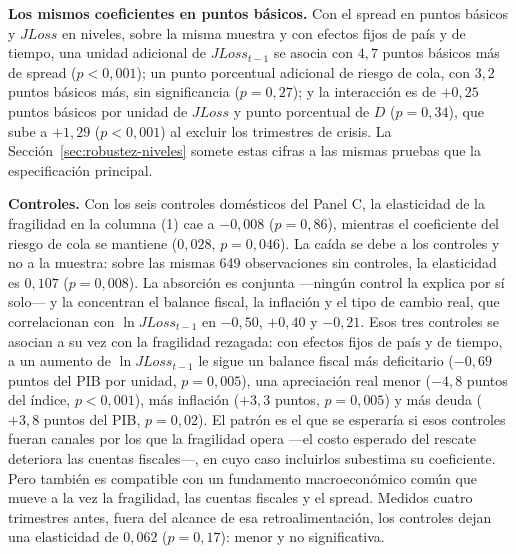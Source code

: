\textbf{Los mismos coeficientes en puntos básicos.} Con el spread en puntos básicos y $JLoss$ en niveles, sobre la misma muestra y con efectos fijos de país y de tiempo, una unidad adicional de $JLoss_{t-1}$ se asocia con $4{,}7$ puntos básicos más de spread ($p<0{,}001$); un punto porcentual adicional de riesgo de cola, con $3{,}2$ puntos básicos más, sin significancia ($p=0{,}27$); y la interacción es de $+0{,}25$ puntos básicos por unidad de $JLoss$ y punto porcentual de $D$ ($p=0{,}34$), que sube a $+1{,}29$ ($p<0{,}001$) al excluir los trimestres de crisis. La Sección~\ref{sec:robustez-niveles} somete estas cifras a las mismas pruebas que la especificación principal.

\textbf{Controles.} Con los seis controles domésticos del Panel C, la elasticidad de la fragilidad en la columna (1) cae a $-0{,}008$ ($p=0{,}86$), mientras el coeficiente del riesgo de cola se mantiene ($0{,}028$, $p=0{,}046$). La caída se debe a los controles y no a la muestra: sobre las mismas 649 observaciones sin controles, la elasticidad es $0{,}107$ ($p=0{,}008$). La absorción es conjunta ---ningún control la explica por sí solo--- y la concentran el balance fiscal, la inflación y el tipo de cambio real, que correlacionan con $\ln JLoss_{t-1}$ en $-0{,}50$, $+0{,}40$ y $-0{,}21$. Esos tres controles se asocian a su vez con la fragilidad rezagada: con efectos fijos de país y de tiempo, a un aumento de $\ln JLoss_{t-1}$ le sigue un balance fiscal más deficitario ($-0{,}69$ puntos del PIB por unidad, $p=0{,}005$), una apreciación real menor ($-4{,}8$ puntos del índice, $p<0{,}001$), más inflación ($+3{,}3$ puntos, $p=0{,}005$) y más deuda ($+3{,}8$ puntos del PIB, $p=0{,}02$). El patrón es el que se esperaría si esos controles fueran canales por los que la fragilidad opera ---el costo esperado del rescate deteriora las cuentas fiscales---, en cuyo caso incluirlos subestima su coeficiente. Pero también es compatible con un fundamento macroeconómico común que mueve a la vez la fragilidad, las cuentas fiscales y el spread. Medidos cuatro trimestres antes, fuera del alcance de esa retroalimentación, los controles dejan una elasticidad de $0{,}062$ ($p=0{,}17$): menor y no significativa.


